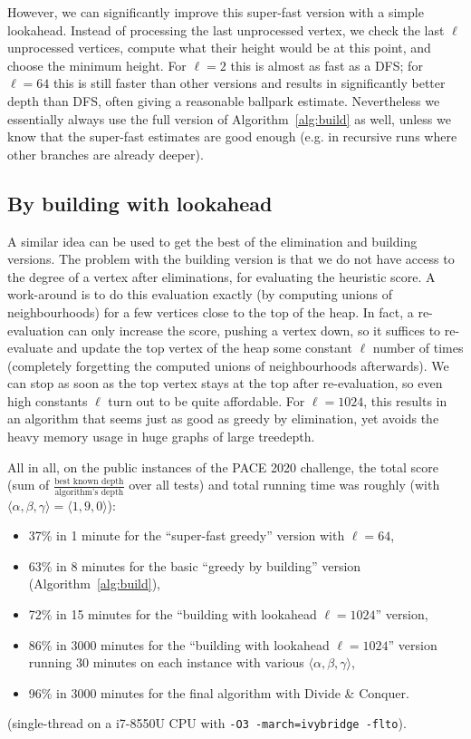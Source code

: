 \documentclass{timgad}
\begin{document}
However, we can significantly improve this super-fast version with a simple lookahead.
Instead of processing the last unprocessed vertex, we check the last $\ell$ unprocessed vertices, compute what their height would be at this point, and choose the minimum height.
For $\ell=2$ this is almost as fast as a DFS;
for $\ell=64$ this is still faster than other versions and results in significantly better depth than DFS, often giving a reasonable ballpark estimate.
Nevertheless we essentially always use the full version of Algorithm~\ref{alg:build} as well, unless we know that the super-fast estimates are good enough (e.g. in recursive runs where other branches are already deeper).

\subsection{By building with lookahead}
A similar idea can be used to get the best of the elimination and building versions.
The problem with the building version is that we do not have access to the degree of a vertex after eliminations, for evaluating the heuristic score.
A work-around is to do this evaluation exactly (by computing unions of neighbourhoods) for a few vertices close to the top of the heap.
In fact, a re-evaluation can only increase the score, pushing a vertex down,
so it suffices to re-evaluate and update the top vertex of the heap some constant $\ell$ number of times (completely forgetting the computed unions of neighbourhoods afterwards).
We can stop as soon as the top vertex stays at the top after re-evaluation, so even high constants $\ell$ turn out to be quite affordable.
For $\ell=1024$, this results in an algorithm that seems just as good as greedy by elimination, yet avoids the heavy memory usage in huge graphs of large treedepth.

All in all, on the public instances of the PACE 2020 challenge, the total score (sum of $\frac{\text{best known depth}}{\text{algorithm's depth}}$ over all tests) and total running time was roughly (with $\langle\alpha,\beta,\gamma\rangle=\langle 1,9,0\rangle$):
\begin{itemize}[itemsep=0pt,parsep=-1ex]
\item 37\% in 1 minute for the ``super-fast greedy'' version with $\ell=64$,\\
\item 63\% in 8 minutes for the basic ``greedy by building'' version (Algorithm~\ref{alg:build}),\\
\item 72\% in 15 minutes for the ``building with lookahead $\ell=1024$'' version,\\
\item 86\% in 3000 minutes for the ``building with lookahead $\ell=1024$'' version running 30 minutes on each instance with various $\langle\alpha,\beta,\gamma\rangle$,\\
\item 96\% in 3000 minutes for the final algorithm with Divide \& Conquer.
\end{itemize}
(single-thread on a i7-8550U CPU with \texttt{-O3 -march=ivybridge -flto}).
\end{document}
